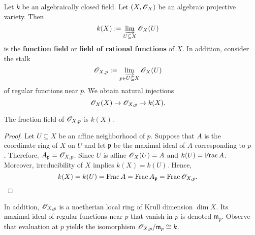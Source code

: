 Let $k$ be an algebraically closed field. Let $(X, {\mathscr O}_{X})$ be an algebraic projective variety. Then 
\[
	k(X) := \varinjlim_{U\subseteq X} {\mathscr O}_{X}(U)
\]
 is the \textbf{function field} or \textbf{field of rational functions} of $X$. In addition, consider the stalk 
\[
	{\mathscr O}_{X,p} := \varinjlim_{p\in U\subseteq X} {\mathscr O}_{X}(U)
\]
of regular functions near $p$. We obtain natural injections 
\[
 	{\mathscr O}_{X}(X) \to {\mathscr O}_{X,p} \to k(X).
\] 
\begin{proposition}\label{prop:fraction-field-local-function-field}
	The fraction field of ${\mathscr O}_{X,p}$ is $k(X)$.
\end{proposition}
\begin{proof}
	Let $U \subseteq X$ be an affine neighborhood of $p$. Suppose that $A$ is the coordinate ring of $X$ on $U$ and let $\mathfrak{p}$ be the maximal ideal of $A$ corresponding to $p$. Therefore, $A_{\mathfrak{p}} = {\mathscr O}_{X,p}$. Since $U$ is affine ${\mathscr O}_{X}(U) = A$ and $k(U) = \operatorname{Frac}{A}$. Moreover, irreducibility of $X$ implies $k(X) = k(U)$. Hence, 
	\[
		k(X) = k(U) = \operatorname{Frac}{A} = \operatorname{Frac}{A_{\mathfrak{p}}} = \operatorname{Frac}{{\mathscr O}_{X,p}}.
	\]
\end{proof}

In addition, ${\mathscr O}_{X,p}$ is a noetherian local ring of Krull dimension $\dim X$.
Its maximal ideal of regular functions near $p$ that vanish in $p$ is denoted $\mathfrak{m}_{p}$. Observe that evaluation at $p$ yields the isomorphism ${\mathscr O}_{X,p}/\mathfrak{m}_{p} \cong k$.


